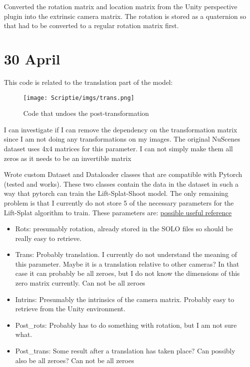 \documentclass[twoside]{report}
\begin{document}
\bigskip
Converted the rotation matrix and location matrix from the Unity perspective plugin into the extrinsic camera matrix. The rotation is stored as a quaternion so that had to be converted to a regular rotation matrix first. 


\section*{30 April}
This code is related to the translation part of the model: 
        \begin{figure}[!hbt]
        \begin{centering}
        \texttt{[image: Scriptie/imgs/trans.png]}
        \caption{Code that undoes the post-transformation}
        \end{centering}
        \end{figure} 
        
I can investigate if I can remove the dependency on the transformation matrix since I am not doing any transformations on my images. The original NuScenes dataset uses 4x4 matrices for this parameter. I can not simply make them all zeros 
as it needs to be an invertible matrix\newline

\bigskip Wrote custom Dataset and Dataloader classes that are compatible with Pytorch (tested and works). These two classes contain the data in the dataset in such a way that pytorch can train the Lift-Splat-Shoot model. The only remaining problem is that I currently do not store 5 of the necessary parameters for the Lift-Splat algorithm to train. These parameters are: \newline
\href{https://nv-tlabs.github.io/lift-splat-shoot/}{possible useful reference}
\begin{itemize}
    \item Rots: presumably rotation, already stored in the SOLO files so should be really easy to retrieve. 
    \item Trans: Probably translation. I currently do not understand the meaning of this parameter. Maybe it is a translation relative to other cameras? In that case it can probably be all zeroes, but I do not know the dimensions of this zero matrix currently. Can not be all zeroes
    \item Intrins: Presumably the intrinsics of the camera matrix. Probably easy to retrieve from the Unity environment.
    \item Post\_rots: Probably has to do something with rotation, but I am not sure what.
    \item Post\_trans: Some result after a translation has taken place? Can possibly also be all zeroes? Can not be all zeroes
\end{itemize}
\end{document}
